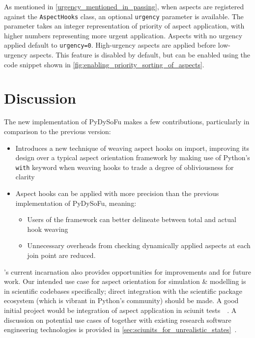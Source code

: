 As mentioned in \cref{urgency_mentioned_in_passing}, when aspects are registered
against the \lstinline{AspectHooks} class, an optional \lstinline{urgency}
parameter is available. The parameter takes an integer representation of
priority of aspect application, with higher numbers representing more urgent
application. Aspects with no urgency applied default to \lstinline{urgency=0}.
High-urgency aspects are applied before low-urgency aspects. This feature is
disabled by default, but can be enabled using the code snippet shown in
\cref{fig:enabling_priority_sorting_of_aspects}.



\section{Discussion}

The new implementation of PyDySoFu makes a few
contributions, particularly in comparison to the
previous version:

\begin{itemize}
    \item Introduces a new technique of weaving aspect hooks on import,
    improving its design over a typical aspect orientation framework by making
    use of Python's \lstinline{with} keyword when weaving hooks to trade a
    degree of obliviousness for clarity
    \item Aspect hooks can be applied with more precision than the previous
    implementation of PyDySoFu, meaning:
        \begin{itemize}
        \item Users of the framework can better delineate between total and
        actual hook weaving
        \item Unnecessary overheads from checking dynamically applied aspects at
        each join point are reduced.
        \end{itemize}
\end{itemize}

\pdsf{}'s current incarnation also provides opportunities for improvements and
for future work. Our intended use case for aspect orientation for simulation \&
modelling is in scientific codebases specifically; direct integration with the
scientific package ecosystem (which is vibrant in Python's community) should be
made. A good initial project would be integration of aspect application in
sciunit tests~\cite{sciunit_primer}~. A discussion on potential use cases of
\pdsf together with existing research software engineering technologies is
provided in \cref{sec:sciunits_for_unrealistic_states}~.

